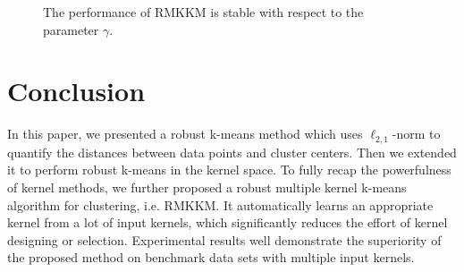 \documentclass{article}
\begin{document}
\begin{figure}[ht]
\centering
{}
\hspace{-.25in}

\hspace{-.25in}
\caption{The performance of RMKKM is stable with respect to the parameter $\gamma$.}
\label{fig:rmkkm_gamma}
\end{figure}


\section{Conclusion}
In this paper, we presented a robust k-means method which uses $\ell_{2,1}$-norm to quantify the distances between data points and cluster centers. Then we extended it to perform robust k-means in the kernel space. To fully recap the powerfulness of kernel methods, we further proposed a robust multiple kernel k-means algorithm for clustering, i.e. RMKKM. It automatically learns an appropriate kernel from a lot of input kernels, which significantly reduces the effort of kernel designing or selection. Experimental results well demonstrate the superiority of the proposed method on benchmark data sets with multiple input kernels.
\end{document}
